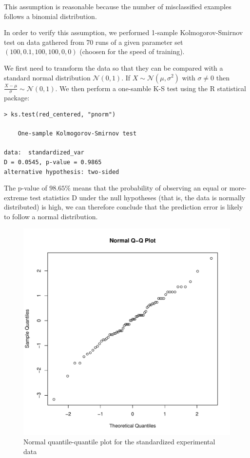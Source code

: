 \documentclass[10pt,a4paper, twocolumn]{article}
\theoremstyle{definition}
\begin{document}
This assumption is reasonable because the number of misclassified examples follows a binomial distribution.

In order to verify this assumption, we performed 1-sample Kolmogorov-Smirnov test on data gathered from 70 runs of a given parameter set $(100, 0.1, 100, 100, 0, 0)$ (choosen for the speed of training).

We first need to transform the data so that they can be compared with a standard normal distribution $\mathcal{N}(0, 1)$. If $X \sim \mathcal{N}(\mu, \sigma^2)$ with $\sigma \neq 0$ then $\frac{X - \mu}{\sigma} \sim \mathcal{N}(0,1)$. We then perform a one-samble K-S test using the R statistical package:

\begin{verbatim}
> ks.test(red_centered, "pnorm")

	One-sample Kolmogorov-Smirnov test

data:  standardized_var
D = 0.0545, p-value = 0.9865
alternative hypothesis: two-sided
\end{verbatim}

The p-value of $98.65\%$ means that the probability of observing an equal or more-extreme test statistics D under the null hypotheses (that is, the data is normally distributed) is high, we can therefore conclude that the prediction error is likely to follow a normal distribution. 

\begin{figure}
\centering
\includegraphics[width=0.95\columnwidth]{qqnorm}
\caption{Normal quantile-quantile plot for the standardized experimental data}
\end{figure}
\end{document}
